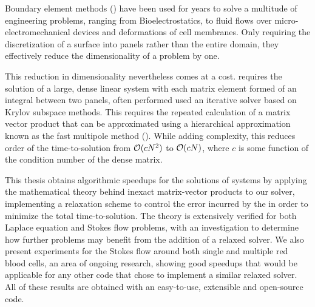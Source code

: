 
Boundary element methods (\bem) have been used for years to solve a multitude of engineering problems, ranging from Bioelectrostatics, to fluid flows over micro-electromechanical devices and deformations of cell membranes. Only requiring the discretization of a surface into panels rather than the entire domain, they effectively reduce the dimensionality of a problem by one.

This reduction in dimensionality nevertheless comes at a cost. {\bem} requires the solution of a large, dense linear system with each matrix element formed of an integral between two panels, often performed used an iterative solver based on Krylov subspace methods. This requires the repeated calculation of a matrix vector product that can be approximated using a hierarchical approximation known as the fast multipole method (\fmm). While adding complexity, this reduces order of the time-to-solution from $\mathcal{O}(cN^{2})$ to $\mathcal{O}(cN)$, where $c$ is some function of the condition number of the dense matrix.

This thesis obtains algorithmic speedups for the solutions of {\fmmbem} systems by applying the mathematical theory behind inexact matrix-vector products to our solver, implementing a relaxation scheme to control the error incurred by the {\fmm} in order to minimize the total time-to-solution. The theory is extensively verified for both Laplace equation and Stokes flow problems, with an investigation to determine how further problems may benefit from the addition of a relaxed solver. We also present experiments for the Stokes flow around both single and multiple red blood cells, an area of ongoing research, showing good speedups that would be applicable for any other code that chose to implement a similar relaxed solver. All of these results are obtained with an easy-to-use, extensible and open-source {\fmmbem} code.




